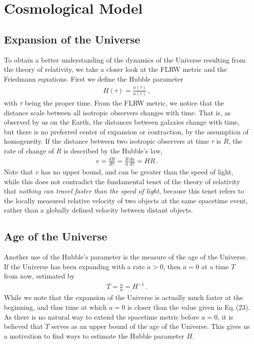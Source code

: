 \documentclass[11pt]{article}
\theoremstyle{break}
\theoremstyle{break}
\begin{document}
\section{Cosmological Model}
\subsection{Expansion of the Universe}
To obtain a better understanding of the dynamics of the Universe resulting from the theory of relativity, we take a closer look at the FLRW metric and the Friedmann equations. First we define the Hubble parameter
\begin{align}
H(\tau) = \frac{\dot{a}(\tau)}{a(\tau)}\,,
\end{align}
with $\tau$ being the proper time. From the FLRW metric, we notice that the distance scale between all isotropic observers changes with time. That is, as observed by us on the Earth, the distances between galaxies change with time, but there is no preferred center of expansion or contraction, by the assumption of homogeneity. If the distance between two isotropic observers at time $\tau$ is $R$, the rate of change of $R$ is described by the Hubble's law,
\begin{align}
v = \frac{dR}{d\tau} = \frac{R}{a}\frac{da}{d\tau} = HR\,.
\end{align}
Note that $v$ has no upper bound, and can be greater than the speed of light, while this does not contradict the fundamental tenet of the theory of relativity that \textit{nothing can travel faster than the speed of light}, because this tenet refers to the locally measured relative velocity of two objects at the same spacetime event, rather than a globally defined velocity between distant objects.\\

\subsection{Age of the Universe}
Another use of the Hubble's parameter is the measure of the age of the Universe. If the Universe has been expanding with a rate $\dot{a} > 0 $, then $a = 0$ at a time $T$ from now, estimated by
\begin{align}
T = \frac{a}{\dot{a}} = H^{-1}\,.
\end{align}
While we note that the expansion of the Universe is actually much faster at the beginning, and thus time at which $a = 0$ is closer than the value given in Eq.\,(23). As there is no natural way to extend the spacetime metric before $a = 0$, it is believed that $T$ serves as an upper bound of the age of the Universe. This gives us a motivation to find ways to estimate the Hubble parameter $H$. \\
\end{document}
